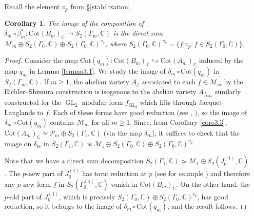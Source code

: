 \documentclass[a4paper,11pt]{amsart}
\numberwithin{equation}{section}
\theoremstyle{plain}
\newtheorem{corollary}[theorem]{Corollary}
\theoremstyle{definition}
\theoremstyle{remark}
\newtheorem{remark}[theorem]{Remark}
\newcommand{\C}{\mathbb{C}}
\DeclareMathOperator{\GL}{GL}
\newcommand{\Cot}{\mathrm{Cot}}
\begin{document}

Recall the element $v_p$ from \S\ref{stabilization}. 
\begin{corollary}\label{coro3.4}
The image of the composition of $\delta_m\circ\beta_m^*\colon \Cot(B_m)_\C\rightarrow S_2(\Gamma_m,\C)$ is the direct sum 
$\mathcal{M}_m\oplus S_2(\Gamma_0,\C)\oplus S_2(\Gamma_0,\C)^{v_p}$, where $S_2(\Gamma_0,\C)^{v_p}=\{f|v_p : f\in S_2(\Gamma_0,\C)\}$.
\end{corollary}

\begin{proof}
{
Consider the map $\Cot(q_m)\colon \Cot(B_m)_\C\hookrightarrow\Cot(A_m)_\C$ induced by the map
$q_m$ in Lemma \ref{lemma3.1}. We study the image of $\delta_m\circ\Cot(q_m)$ in $S_2(\Gamma_m,\C)$. If $m\geq 1$, the abelian variety $A_f$ associated to each $f\in \mathcal{M}_m$ by the Eichler--Shimura construction is isogenous to the abelian variety $A_{f_{\GL_2}}$ similarly constructed for the $\GL_2$ modular form $f_{\GL_2}$ which lifts through Jacquet--Langlands to $f$. 
Each of these forms have good reduction (see \cite[Chapter 3, Section 1]{MW}, \cite[\S1.1]{OhtaMA}), so the image of $\delta_m\circ\Cot(q_m)$ contains $\mathcal{M}_m$ for all $m\geq 1$. Since, from Corollary \ref{coro3.3}, 
$\Cot(A_m)_\C\simeq\mathcal{P}_m\oplus S_2(\Gamma_1,\C)$ (via the map $\delta_m$), it suffices to check that the image on $\delta_m$ in $S_2(\Gamma_1,\C)$ is $\mathcal{M}_1\oplus S_2(\Gamma_0,\C)\oplus S_2(\Gamma_0,\C)^{v_p}$.

Note that we have a direct sum decomposition 
$S_2(\Gamma_1,\C)\simeq \mathcal{M}_1\oplus S_2(J^{(1)}_0,\C)$. The $p$-new part of $J^{(1)}_0$ has toric reduction at $p$ (see for example \cite{LRV}) and therefore any $p$-new form $f$ in $S_2(\Gamma^{(1)}_0,\C)$ vanish in $\Cot(B_m)_\C$. On the other hand, the $p$-old part of $J^{(1)}_0$, which is precisely $S_2(\Gamma_0,\C)\oplus S_2(\Gamma_0,\C)^{v_p}$, has good reduction, so it belongs to the image of $\delta_m\circ\Cot(q_m)$, and the result follows.}
\end{proof}
\end{document}
